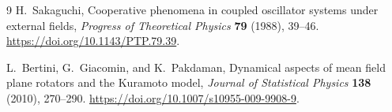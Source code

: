 \documentclass[10pt]{article}
\theoremstyle{remark}
\begin{document}
\begin{thebibliography}{9}
H.~Sakaguchi, Cooperative phenomena in coupled oscillator systems under
external fields, \emph{Progress of Theoretical Physics} \textbf{79} (1988),
39--46. \url{https://doi.org/10.1143/PTP.79.39}.

L.~Bertini, G.~Giacomin, and K.~Pakdaman, Dynamical aspects of mean field
plane rotators and the Kuramoto model, \emph{Journal of Statistical Physics}
\textbf{138} (2010), 270--290.
\url{https://doi.org/10.1007/s10955-009-9908-9}.
\end{thebibliography}
\fi
\end{document}
